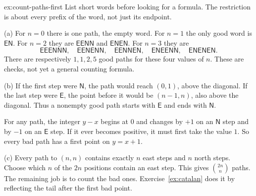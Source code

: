 \begin{solution}{ex:count-paths-first}
\idea List short words before looking for a formula. The restriction
is about every prefix of the word, not just its endpoint.

\writeup (a) For $n=0$ there is one path, the empty word.
For $n=1$ the only good word is $\mathsf{EN}$.
For $n=2$ they are $\mathsf{EENN}$ and $\mathsf{ENEN}$.
For $n=3$ they are
\[
\mathsf{EEENNN},\quad \mathsf{EENENN},\quad
\mathsf{EENNEN},\quad \mathsf{ENEENN},\quad
\mathsf{ENENEN}.
\]
There are respectively $1,1,2,5$ good paths for these four values
of $n$. These are checks, not yet a general counting formula.

(b) If the first step were $\mathsf N$, the path would
reach $(0,1)$, above the diagonal. If the last step were
$\mathsf E$, the point before it would be $(n-1,n)$, also
above the diagonal. Thus a nonempty good path starts with
$\mathsf E$ and ends with $\mathsf N$.

For any path, the integer $y-x$ begins at $0$ and changes by
$+1$ on an $\mathsf N$ step and by $-1$ on an $\mathsf E$ step.
If it ever becomes positive, it must first take the value $1$.
So every bad path has a first point on $y=x+1$.

(c) Every path to $(n,n)$ contains exactly $n$ east steps
and $n$ north steps. Choose which $n$ of the $2n$ positions
contain an east step. This gives $\binom{2n}n$ paths.
The remaining job is to count the bad ones. Exercise~\ref{ex:catalan}
does it by reflecting the tail after the first bad point.
\end{solution}


